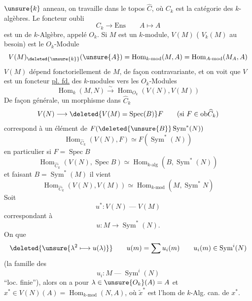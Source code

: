 $\unsure{k}$ anneau, on travaille dans le topos $\widehat C$, où $C_k$ est la catégorie des $k$-algèbres. Le foncteur oubli
\[
C_k\longrightarrow\mathrm{Ens}\qquad A\longmapsto A
\]
est un  de $k$-Algèbre, appelé $O_k$. Si $M$ est un $k$-module, $V(M)$ ( $V_k(M)$ au besoin) est le  $O_k$-Module
\[
V(M)_{\deleted{\unsure{k}}}(\unsure{A})=\operatorname{Hom}_{k\text{-mod}}(M,A)=\operatorname{Hom}_{A\text{-mod}}(M_A,A)
\]
$V(M)$ dépend fonctoriellement de $M$, de façon contravariante, et on voit que $V$ est un foncteur \uline{pl. fd.} des $k$-modules vers les $O_k$-Modules
\[
\operatorname{Hom}_k(M,N)\xrightarrow{\sim}\operatorname{Hom}_{O_k}(V(N),V(M))
\]
 De façon générale, un morphisme dans $\widehat C_k$
\[
V(N)\longrightarrow\deleted{V(M)=\operatorname{Spec}(B)}F\qquad(\text{si }F\in\mathrm{ob}\widehat C_k)
\]
 correspond à un  élément de $F(\deleted{\unsure{B}}\operatorname{Sym}^*(N))$
\[
\operatorname{Hom}_{\widehat C_k}(V(N),F)\simeq F(\operatorname{Sym}^*(N))
\]
en particulier si $F=\operatorname{Spec} B$
\[
\operatorname{Hom}_{\widehat C_k}(V(N),\operatorname{Spec}B)\simeq
\operatorname{Hom}_{k\text{-alg}}(B,\operatorname{Sym}^*(N))
\]
et faisant $B=\operatorname{Sym}^*(M)$ il vient
\[
\operatorname{Hom}_{\widehat C_k}(V(N),V(M))\simeq
\operatorname{Hom}_{k\text{-mod}}(M,\operatorname{Sym}^*N)
\]
Soit
\[
u^*:V(N)\mathbin{\text{---}}V(M)
\]
correspondant à
\[
u:M\longrightarrow\operatorname{Sym}^*(N).
\]
On  que
\[
\deleted{\unsure{\lambda^2\longmapsto u(\lambda)}}
\qquad u(m)=\sum u_i(m)\qquad u_i(m)\in\operatorname{Sym}^i(N)
\]
(la famille des  
\[
u_i:M\mathbin{\text{---}}\operatorname{Sym}^i(N)
\]
``loc. finie''), alors on a pour $\lambda\in\unsure{O_k}(A)=A$
et $x^*\in V(N)(A)=\operatorname{Hom}_{k\text{-mod}}(N,A)$,
où $\widetilde{x}^*$ est l'hom de $k$-Alg.  can. de $x^*$.

